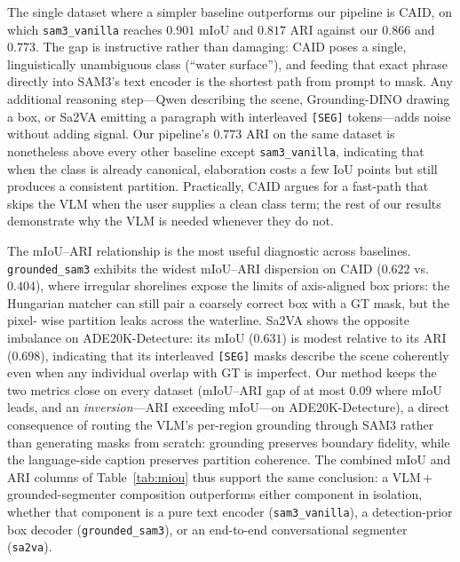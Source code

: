 The single dataset where a simpler baseline outperforms our pipeline is
CAID, on which \texttt{sam3\_vanilla} reaches $0.901$ mIoU and $0.817$
ARI against our $0.866$ and $0.773$. The gap is instructive rather than
damaging: CAID poses a single, linguistically unambiguous class
(``water surface''), and feeding that exact phrase directly into SAM3's
text encoder is the shortest path from prompt to mask. Any additional
reasoning step---Qwen describing the scene, Grounding-DINO drawing a
box, or Sa2VA emitting a paragraph with interleaved \texttt{[SEG]}
tokens---adds noise without adding signal. Our pipeline's $0.773$ ARI
on the same dataset is nonetheless above every other baseline except
\texttt{sam3\_vanilla}, indicating that when the class is already
canonical, elaboration costs a few IoU points but still produces a
consistent partition. Practically, CAID argues for a fast-path that
skips the VLM when the user supplies a clean class term; the rest of
our results demonstrate why the VLM is needed whenever they do not.

The mIoU--ARI relationship is the most useful diagnostic across
baselines. \texttt{grounded\_sam3} exhibits the widest mIoU--ARI
dispersion on CAID ($0.622$ vs. $0.404$), where irregular shorelines
expose the limits of axis-aligned box priors: the Hungarian matcher
can still pair a coarsely correct box with a GT mask, but the pixel-
wise partition leaks across the waterline. Sa2VA shows the opposite
imbalance on ADE20K-Detecture: its mIoU ($0.631$) is modest relative to
its ARI ($0.698$), indicating that its interleaved \texttt{[SEG]}
masks describe the scene coherently even when any individual overlap
with GT is imperfect. Our method keeps the two metrics close on every
dataset (mIoU--ARI gap of at most $0.09$ where mIoU leads, and an
\emph{inversion}---ARI exceeding mIoU---on ADE20K-Detecture), a direct
consequence of routing the VLM's per-region grounding through SAM3
rather than generating masks from scratch: grounding preserves boundary fidelity, while the
language-side caption preserves partition coherence. The combined
mIoU and ARI columns of Table~\ref{tab:miou} thus support the same
conclusion: a VLM\,+\,grounded-segmenter composition outperforms
either component in isolation, whether that component is a pure text
encoder (\texttt{sam3\_vanilla}), a detection-prior box decoder
(\texttt{grounded\_sam3}), or an end-to-end conversational segmenter
(\texttt{sa2va}).
